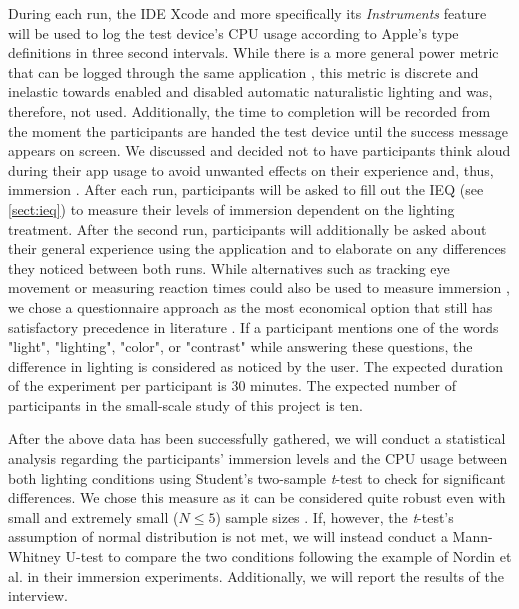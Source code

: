 \documentclass[12pt,twoside,english]{article}
\begin{document}
During each run, the IDE Xcode and more specifically its \textit{Instruments} feature \cite{apple_xcode_nodate} will be used to log the test device's \gls{CPU} usage according to Apple's type definitions \cite{apple_system_nodate} in three second intervals.
While there is a more general power metric that can be logged through the same application \cite{apple_energy_nodate-1}, this metric is discrete and inelastic towards enabled and disabled automatic naturalistic lighting and was, therefore, not used.
Additionally, the time to completion will be recorded from the moment the participants are handed the test device until the success message appears on screen.
We discussed and decided not to have participants think aloud during their app usage to avoid unwanted effects on their experience and, thus, immersion \cite{van_den_haak_retrospective_2003}.
After each run, participants will be asked to fill out the \gls{IEQ} (see \ref{sect:ieq}) to measure their levels of immersion dependent on the lighting treatment.
After the second run, participants will additionally be asked about their general experience using the application and to elaborate on any differences they noticed between both runs.
While alternatives such as tracking eye movement or measuring reaction times could also be used to measure immersion \cite{jennett_measuring_2008}, we chose a questionnaire approach as the most economical option that still has satisfactory precedence in literature \cite{boyle_engagement_2012}.
If a participant mentions one of the words "light", "lighting", "color", or "contrast" while answering these questions, the difference in lighting is considered as noticed by the user.
The expected duration of the experiment per participant is 30 minutes.
The expected number of participants in the small-scale study of this project is ten.

After the above data has been successfully gathered, we will conduct a statistical analysis regarding the participants' immersion levels and the CPU usage between both lighting conditions using Student's two-sample \textit{t}-test to check for significant differences.
We chose this measure as it can be considered quite robust even with small and extremely small ($ N \leq 5 $) sample sizes \cite{de_winter_using_2013}.
If, however, the \textit{t}-test's assumption of normal distribution is not met, we will instead conduct a Mann-Whitney U-test to compare the two conditions following the example of Nordin et al. \cite{nordin_attention_2013} in their immersion experiments.
Additionally, we will report the results of the interview.
\end{document}
